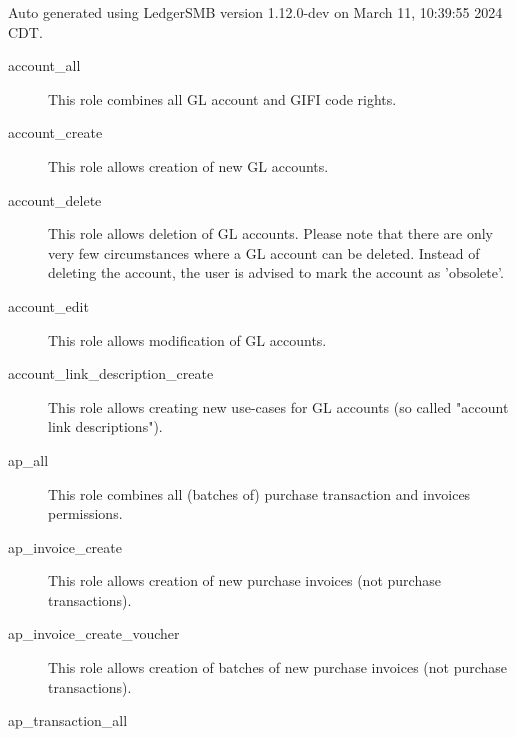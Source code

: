 
Auto generated using LedgerSMB version 1.12.0-dev on March 11, 10:39:55 2024 CDT.

\begin{description}
\item [account\_all] \htmlspacing 
                         This role combines all \gls{GL}  account and GIFI code rights.
\item [account\_create] \htmlspacing 
                         This role allows creation of new \gls{GL}  accounts.
\item [account\_delete] \htmlspacing 
                         This role allows deletion of \gls{GL}  accounts.
                         Please note that there are only very few circumstances
                         where a \gls{GL}  account can be deleted.  Instead of deleting
                         the account, the user is advised to mark the account
                         as 'obsolete'.
\item [account\_edit] \htmlspacing 
                         This role allows modification of \gls{GL}  accounts.
\item [account\_link\_description\_create] \htmlspacing 
                         This role allows creating new use-cases for \gls{GL} 
                         accounts (so called "account link descriptions").
\item [ap\_all] \htmlspacing 
                         This role combines all (batches of) purchase transaction and invoices permissions.
\item [ap\_invoice\_create] \htmlspacing 
                         This role allows creation of new purchase invoices (not purchase transactions).
\item [ap\_invoice\_create\_voucher] \htmlspacing 
                         This role allows creation of batches of new purchase invoices (not purchase transactions).
\item [ap\_transaction\_all] \htmlspacing 

\end{description}
